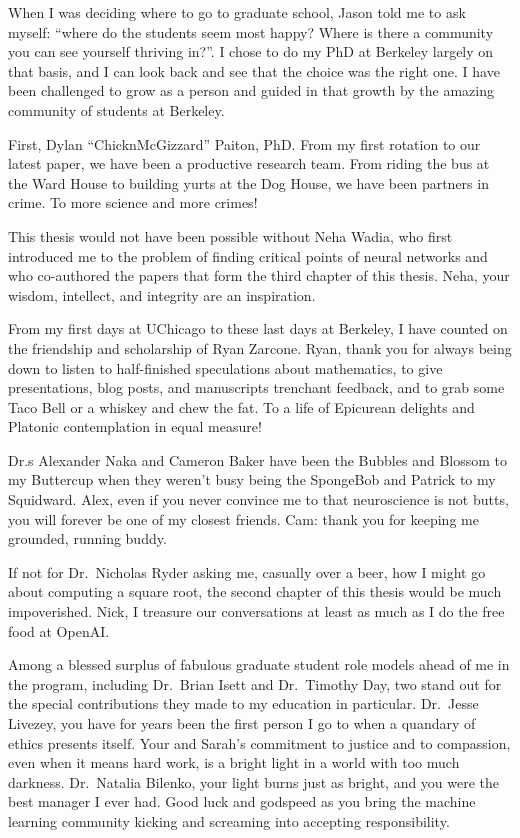 \begin{frontmatter}
\begin{acknowledgements}
	When I was deciding where to go to graduate school,
	Jason told me to ask myself:
	\enquote{where do the students seem most happy?
	Where is there a community you can see yourself thriving in?}.
	I chose to do my PhD at Berkeley largely on that basis,
	and I can look back and see that the choice was the right one.
	I have been challenged to grow as a person
	and guided in that growth by the amazing community
	of students at Berkeley.

	First, Dylan \enquote{ChicknMcGizzard} Paiton, PhD.
	From my first rotation to our latest paper,
	we have been a productive research team.
	From riding the bus at the Ward House
	to building yurts at the Dog House,
	we have been partners in crime.
	To more science and more crimes!

	This thesis would not have been possible
	without Neha Wadia,
	who first introduced me to the problem
	of finding critical points of neural networks
	and who co-authored the papers
	that form the third chapter of this thesis.
	Neha, your wisdom, intellect, and integrity
	are an inspiration.

	From my first days at UChicago
	to these last days at Berkeley,
	I have counted on the friendship and scholarship
	of Ryan Zarcone.
	Ryan, thank you for always being down
	to listen to half-finished speculations
	about mathematics,
	to give presentations, blog posts,
	and manuscripts trenchant feedback,
	and to grab some Taco Bell or a whiskey
	and chew the fat.
	To a life of Epicurean delights
	and Platonic contemplation
	in equal measure!

	Dr.s Alexander Naka and Cameron Baker
	have been the Bubbles and Blossom
	to my Buttercup
	when they weren't busy being
	the SpongeBob and Patrick
	to my Squidward.
	Alex, even if you never convince me
	to that neuroscience is not butts,
	you will forever be one of my closest friends.
	Cam: thank you for keeping me grounded,
	running buddy.

	If not for Dr.\ Nicholas Ryder asking me,
	casually over a beer,
	how I might go about computing a square root,
	the second chapter of this thesis would be much impoverished.
	Nick, I treasure our conversations
	at least as much as I do the free food at OpenAI\@.

	Among a blessed surplus of fabulous graduate student
	role models ahead of me in the program,
	including Dr.\ Brian Isett and Dr.\ Timothy Day,
	two stand out for the special contributions they made to
	my education in particular.
	Dr.\ Jesse Livezey,
	you have for years been the first person I go to
	when a quandary of ethics presents itself.
	Your and Sarah's commitment
	to justice and to compassion,
	even when it means hard work,
	is a bright light in a world with too much darkness.
	Dr.\ Natalia Bilenko,
	your light burns just as bright,
	and you were the best manager I ever had.
	Good luck and godspeed as you bring
	the machine learning community
	kicking and screaming into
	accepting responsibility.


\end{acknowledgements}
\end{frontmatter}
